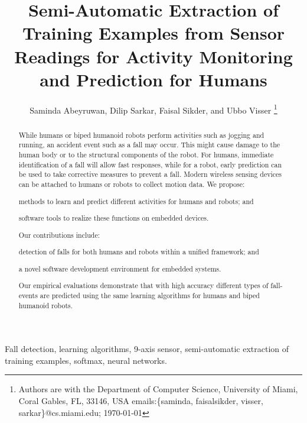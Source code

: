 \documentclass{IEEEtran}
\title{Semi-Automatic Extraction of  Training Examples from Sensor Readings for Activity Monitoring and Prediction for Humans}
\author{{Saminda Abeyruwan}, {Dilip Sarkar}, {Faisal Sikder},   and {Ubbo Visser}
\thanks{ Authors are with
 the
Department of Computer Science, University of Miami,
  Coral Gables, FL, 33146, USA
{ emails:\{saminda, faisalsikder, visser, sarkar\}@cs.miami.edu};
\today} }
\begin{document}
\maketitle

\begin{abstract}
While humans or biped humanoid robots perform activities such as jogging and running, an accident 
event such as a fall may occur. This might cause damage to the human body or 
to the structural components of the robot. For humans, immediate identification of a fall 
will allow fast responses, while for a robot, early prediction can be used to take corrective 
measures to prevent a fall. Modern wireless sensing devices can be attached to humans or robots to 
collect motion data. We propose: \begin{inparaenum}[($i$)] \item 
methods to learn and predict different activities for humans and robots; and \item software 
tools to realize these functions  on embedded devices. \end{inparaenum} Our contributions include: 
\begin{inparaenum}[($i$)] \item detection of falls for both humans and robots within a unified 
framework; and \item  a  novel software development environment for embedded systems. 
\end{inparaenum} Our empirical evaluations demonstrate that with high accuracy different types of  
fall-events are predicted using the same learning algorithms for humans and biped humanoid robots. 
\end{abstract}

\begin{IEEEkeywords} Fall detection, learning algorithms, 9-axis sensor, semi-automatic extraction of training examples,  softmax, neural networks.
\end{IEEEkeywords}

\end{document}
